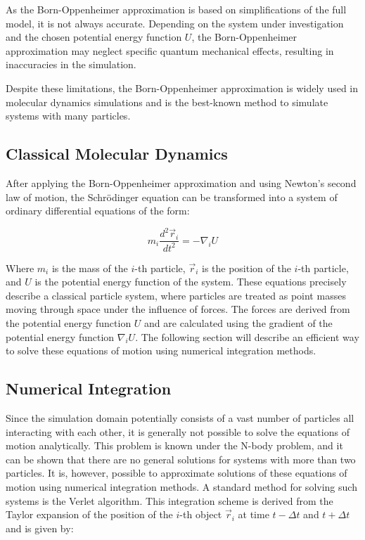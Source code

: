 As the Born-Oppenheimer approximation is based on simplifications of the full model, it is not always accurate. Depending on the system under investigation and the chosen potential energy function $U$, the Born-Oppenheimer approximation may neglect specific quantum mechanical effects, resulting in inaccuracies in the simulation.

Despite these limitations, the Born-Oppenheimer approximation is widely used in molecular dynamics simulations and is the best-known method to simulate systems with many particles.

\subsection{Classical Molecular Dynamics}

After applying the Born-Oppenheimer approximation and using Newton's second law of motion, the Schrödinger equation can be transformed into a system of ordinary differential equations of the form:

\begin{equation}
      m_i \frac{d^2 \vec{r}_i}{dt^2} = -\nabla_i U
\end{equation}

Where $m_i$ is the mass of the $i$-th particle, $\vec{r}_i$ is the position of the $i$-th particle, and $U$ is the potential energy function of the system. These equations precisely describe a classical particle system, where particles are treated as point masses moving through space under the influence of forces. The forces are derived from the potential energy function $U$ and are calculated using the gradient of the potential energy function $\nabla_i U$. The following section will describe an efficient way to solve these equations of motion using numerical integration methods.

\subsection{Numerical Integration}

Since the simulation domain potentially consists of a vast number of particles all interacting with each other, it is generally not possible to solve the equations of motion analytically. This problem is known under the N-body problem, and it can be shown that there are no general solutions for systems with more than two particles. It is, however, possible to approximate solutions of these equations of motion using numerical integration methods. A standard method for solving such systems is the Verlet algorithm. This integration scheme is derived from the Taylor expansion of the position of the $i$-th object $\vec{r}_i$ at time $t - \Delta t$ and $t + \Delta t$ and is given by:

